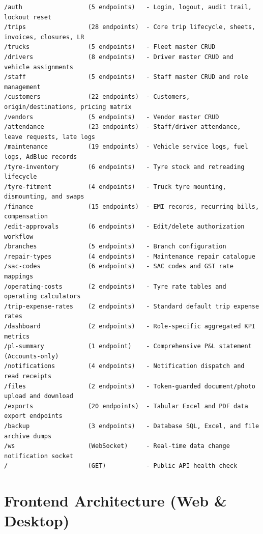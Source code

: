 \documentclass[11pt,a4paper]{article}
\begin{document}
\begin{lstlisting}[style=asciiart]
/auth                  (5 endpoints)   - Login, logout, audit trail, lockout reset
/trips                 (28 endpoints)  - Core trip lifecycle, sheets, invoices, closures, LR
/trucks                (5 endpoints)   - Fleet master CRUD
/drivers               (8 endpoints)   - Driver master CRUD and vehicle assignments
/staff                 (5 endpoints)   - Staff master CRUD and role management
/customers             (22 endpoints)  - Customers, origin/destinations, pricing matrix
/vendors               (5 endpoints)   - Vendor master CRUD
/attendance            (23 endpoints)  - Staff/driver attendance, leave requests, late logs
/maintenance           (19 endpoints)  - Vehicle service logs, fuel logs, AdBlue records
/tyre-inventory        (6 endpoints)   - Tyre stock and retreading lifecycle
/tyre-fitment          (4 endpoints)   - Truck tyre mounting, dismounting, and swaps
/finance               (15 endpoints)  - EMI records, recurring bills, compensation
/edit-approvals        (6 endpoints)   - Edit/delete authorization workflow
/branches              (5 endpoints)   - Branch configuration
/repair-types          (4 endpoints)   - Maintenance repair catalogue
/sac-codes             (6 endpoints)   - SAC codes and GST rate mappings
/operating-costs       (2 endpoints)   - Tyre rate tables and operating calculators
/trip-expense-rates    (2 endpoints)   - Standard default trip expense rates
/dashboard             (2 endpoints)   - Role-specific aggregated KPI metrics
/pl-summary            (1 endpoint)    - Comprehensive P&L statement (Accounts-only)
/notifications         (4 endpoints)   - Notification dispatch and read receipts
/files                 (2 endpoints)   - Token-guarded document/photo upload and download
/exports               (20 endpoints)  - Tabular Excel and PDF data export endpoints
/backup                (3 endpoints)   - Database SQL, Excel, and file archive dumps
/ws                    (WebSocket)     - Real-time data change notification socket
/                      (GET)           - Public API health check
\end{lstlisting}

\section{Frontend Architecture (Web \& Desktop)}
\end{document}
